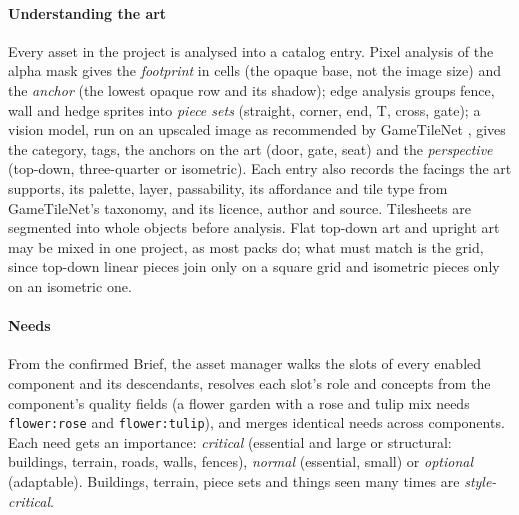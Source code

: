 \documentclass[conference]{IEEEtran}
\begin{document}
\paragraph{Understanding the art} Every asset in the project is analysed into a catalog
entry. Pixel analysis of the alpha mask gives the \emph{footprint} in cells (the opaque
base, not the image size) and the \emph{anchor} (the lowest opaque row and its shadow);
edge analysis groups fence, wall and hedge sprites into \emph{piece sets} (straight,
corner, end, T, cross, gate); a vision model, run on an upscaled image as recommended by
GameTileNet \cite{gametilenet}, gives the category, tags, the anchors on the art (door,
gate, seat) and the \emph{perspective} (top-down, three-quarter or isometric). Each entry
also records the facings the art supports, its palette, layer, passability, its
affordance and tile type from GameTileNet's taxonomy, and its licence, author and source.
Tilesheets are segmented into whole objects before analysis. Flat top-down art and
upright art may be mixed in one project, as most packs do; what must match is the grid,
since top-down linear pieces join only on a square grid and isometric pieces only on an
isometric one.

\paragraph{Needs} From the confirmed Brief, the asset manager walks the slots of every
enabled component and its descendants, resolves each slot's role and concepts from the
component's quality fields (a flower garden with a rose and tulip mix needs
\texttt{flower:rose} and \texttt{flower:tulip}), and merges identical needs across
components. Each need gets an importance: \emph{critical} (essential and large or
structural: buildings, terrain, roads, walls, fences), \emph{normal} (essential, small)
or \emph{optional} (adaptable). Buildings, terrain, piece sets and things seen many times
are \emph{style-critical}.
\end{document}
